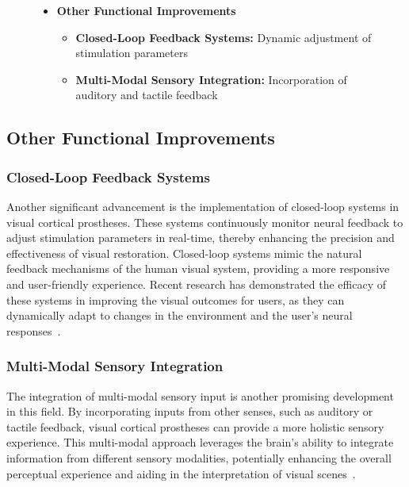 \documentclass[twocolumn,10pt]{article}
\begin{document}
\begin{figure}[ht!]
\begin{tcolorbox}
\begin{itemize}
                  \item \textbf{Other Functional Improvements}
                        \begin{itemize}
                              \item \textbf{Closed-Loop Feedback Systems:} Dynamic adjustment of stimulation parameters
                              \item \textbf{Multi-Modal Sensory Integration:} Incorporation of auditory and tactile feedback
                        \end{itemize}
            \end{itemize}
      \end{tcolorbox}
\end{figure}

\subsection*{Other Functional Improvements}
\subsubsection*{Closed-Loop Feedback Systems}
Another significant advancement is the implementation of closed-loop systems in
visual cortical prostheses. These systems continuously monitor neural feedback
to adjust stimulation parameters in real-time, thereby enhancing the precision
and effectiveness of visual restoration. Closed-loop systems mimic the natural
feedback mechanisms of the human visual system, providing a more responsive and
user-friendly experience. Recent research has demonstrated the efficacy of these
systems in improving the visual outcomes for users, as they can dynamically
adapt to changes in the environment and the user's neural
responses~\parencite{leviEditorialClosedLoopSystems2018}.

\subsubsection*{Multi-Modal Sensory Integration}
The integration of multi-modal sensory input is another promising development in
this field. By incorporating inputs from other senses, such as auditory or
tactile feedback, visual cortical prostheses can provide a more holistic sensory
experience. This multi-modal approach leverages the brain's ability to integrate
information from different sensory modalities, potentially enhancing the overall
perceptual experience and aiding in the interpretation of visual
scenes~\parencite{wanArtificialSensoryNeuron2020}.
\end{document}
